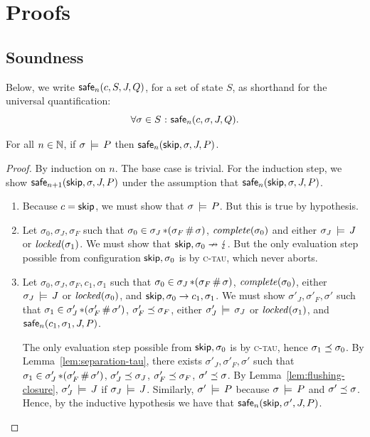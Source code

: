 \documentclass[11pt]{report}
\begin{document}

 

\appendix

\chapter{Proofs}

\section{Soundness}
\label{sec:soundness-proofs}
Below, we write $\mathsf{safe}_{n}(c,S,J,Q)$, for a set of state $S$, as shorthand for the universal quantification: \[ \forall \sigma \in S \operatorname{\,:\,} \mathsf{safe}_{n}(c,\sigma,J,Q).\]

\begin{lemma}
	\label{lem:skip-safe}
	For all $n \in \mathbb{N}$, if $\sigma \,\models\, P$ then $\mathsf{safe}_{n}(\operatorname{\mathsf{skip}},\sigma,J,P)$. 
\end{lemma}

\begin{proof}
	By induction on $n$. The base case is trivial. For the induction step, we show $\mathsf{safe}_{n+1}(\operatorname{\mathsf{skip}},\sigma,J,P)$ under the assumption that $\mathsf{safe}_{n}(\operatorname{\mathsf{skip}},\sigma,J,P)$. 
	\begin{enumerate}
		\item Because $c = \operatorname{\mathsf{skip}}$, we must show that $\sigma \,\models\, P$. But this is true by hypothesis. 

		\item Let $\sigma_0,\sigma_J,\sigma_F$ such that $\sigma_0 \in \sigma_J \operatorname{\ast} (\sigma_F \operatorname{\#} \sigma)$, $\mathit{complete}(\sigma_0)$ and either $\sigma_J \,\models\, J$ or $\mathit{locked}(\sigma_1)$. We must show that $\operatorname{\mathsf{skip}},\sigma_0 \nrightarrow \lightning$. But the only evaluation step possible from configuration $\operatorname{\mathsf{skip}},\sigma_0$ is by \textsc{c-tau}, which never aborts. 

		\item Let $\sigma_0,\sigma_J,\sigma_F,c_1,\sigma_1$ such that $\sigma_0 \in \sigma_J \operatorname{\ast} (\sigma_F \operatorname{\#} \sigma)$, $\mathit{complete}(\sigma_0)$, either $\sigma_J \,\models\, J$ or $\mathit{locked}(\sigma_0)$, and $\operatorname{\mathsf{skip}},\sigma_0 \rightarrow c_1,\sigma_1$. We must show $\sigma'_J,\sigma'_F,\sigma'$ such that $\sigma_1 \in \sigma'_J \operatorname{\ast} (\sigma'_F \operatorname{\#} \sigma')$, $\sigma'_F \preceq \sigma_F$, either $\sigma'_J \,\models\, \sigma_J$ or $\mathit{locked}(\sigma_1)$, and $\mathsf{safe}_{n}(c_1,\sigma_1,J,P)$.

		The only evaluation step possible from $\operatorname{\mathsf{skip}},\sigma_0$ is by \textsc{c-tau}, hence $\sigma_1 \preceq \sigma_0$. By Lemma~\ref{lem:separation-tau}, there exists $\sigma'_J,\sigma'_F,\sigma'$ such that $\sigma_1 \in \sigma'_J \operatorname{\ast} (\sigma'_F \operatorname{\#} \sigma')$, $\sigma'_J \preceq \sigma_J$, $\sigma'_F \preceq \sigma_F$, $\sigma' \preceq \sigma$. By Lemma~\ref{lem:flushing-closure}, $\sigma'_J \,\models\, J$ if $\sigma_J \,\models\, J$. Similarly, $\sigma' \,\models\, P$ because $\sigma \,\models\, P$ and $\sigma' \preceq \sigma$. Hence, by the inductive hypothesis we have that $\mathsf{safe}_{n}(\operatorname{\mathsf{skip}},\sigma',J,P)$. 
	\end{enumerate}
\end{proof}
\end{document}
